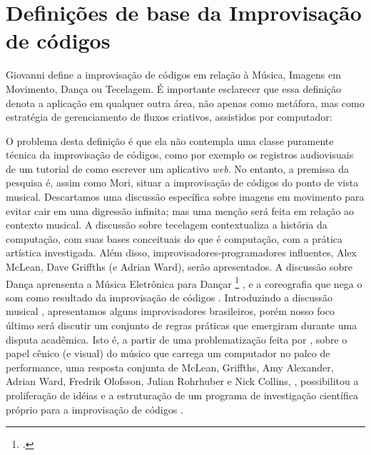 \chapter{Definições de base da Improvisação de códigos}\label{cap:introducao}

Giovanni  define a improvisação de códigos em relação à Música, Imagens em Movimento, Dança ou Tecelagem. É importante esclarecer que essa definição denota a aplicação em qualquer outra área, não apenas como metáfora, mas como estratégia de gerenciamento de fluxos criativos, assistidos por computador:

\begin{citacao}
\end{citacao}

O problema desta definição é que ela não contempla uma classe puramente técnica da improvisação de códigos, como por exemplo os registros audiovisuais de um tutorial de como escrever um aplicativo \emph{web}. No entanto, a premissa da pesquisa é, assim como Mori, situar a improvisação de códigos do ponto de vista musical. Descartamos uma discussão específica sobre imagens em movimento para evitar cair em uma digressão infinita; mas uma menção será feita em relação ao contexto musical. A discussão sobre tecelagem  contextualiza a história da computação, com suas bases conceituais do que é computação, com a prática artística investigada. Além disso, improvisadores-programadores influentes, Alex McLean, Dave Griffths (e Adrian Ward), serão apresentados. A discussão sobre Dança aprensenta a Música Eletrônica para Dançar \footnote{.} , e a coreografia que nega o som como resultado da improvisação de códigos . Introduzindo a discussão musical , apresentamos alguns improvisadores brasileiros, porém nosso foco último será discutir um conjunto de regras práticas que emergiram durante uma disputa acadêmica. Isto é, a partir de uma problematização feita por , sobre o papel cênico (e visual) do músico que carrega um computador no palco de performance, uma resposta conjunta de McLean, Griffths, Amy Alexander, Adrian Ward, Fredrik Olofsson, Julian Rohrhuber e Nick Collins, \cite{ward_live_2004}, possibilitou a proliferação de idéias e a estruturação de um programa de investigação científica próprio para a improvisação de códigos .

